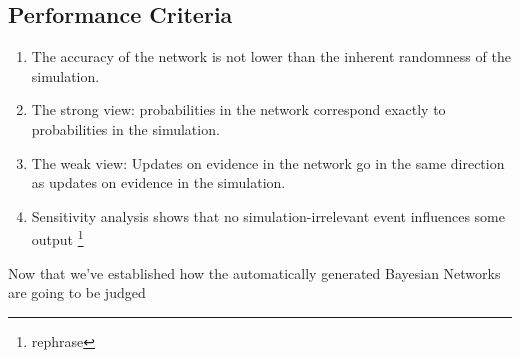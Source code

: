 \subsection{Performance Criteria}
\begin{enumerate}
\item The accuracy of the network is not lower than the inherent randomness of the simulation.
\item The strong view: probabilities in the network correspond exactly to probabilities in the simulation.
\item The weak view: Updates on evidence in the network go in the same direction as updates on evidence in the simulation.
\item Sensitivity analysis shows that no simulation-irrelevant event influences some output \footnote{rephrase}
\end{enumerate}

Now that we've established how the automatically generated Bayesian Networks are going to be judged


